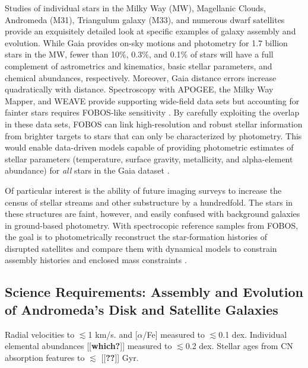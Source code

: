 \documentclass[11pt,a4paper,twoside,onecolumn,openany,final,oldfontcommands]{memoir}
\newcommand{\edit}[2][todo]{{\color{#1}[[{\bf #2}]]}}
\begin{document}
Studies of individual stars in the Milky Way (MW), Magellanic Clouds, Andromeda (M31), Triangulum galaxy (M33), and numerous dwarf satellites provide an exquisitely detailed look at specific examples of galaxy assembly and evolution. While Gaia provides on-sky motions and photometry for 1.7 billion stars in the MW, fewer than 10\%, 0.3\%, and 0.1\% of stars will have a full complement of astrometrics and kinematics, basic stellar parameters, and chemical abundances, respectively.  Moreover, Gaia distance errors increase quadratically with distance.  Spectroscopy with APOGEE, the Milky Way Mapper, and WEAVE provide supporting wide-field data sets but accounting for fainter stars requires FOBOS-like sensitivity \citep[see][]{dey19,sanderson19}.  By carefully exploiting the overlap in these data sets, FOBOS can link high-resolution and robust stellar information from brighter targets to stars that can only be characterized by photometry.  This would enable data-driven models capable of providing photometric estimates of stellar parameters (temperature, surface gravity, metallicity, and alpha-element abundance) for {\it all} stars in the Gaia dataset  \citep[see][]{2015ApJ...808...16N, 2018arXiv180401530T, 2018arXiv180803278T}. 

Of particular interest is the ability of future imaging surveys to increase the census of stellar streams and other substructure by a hundredfold.  The stars in these structures are faint, however, and easily confused with background galaxies in ground-based photometry.  With spectrocopic reference samples from FOBOS, the goal is to photometrically reconstruct the star-formation histories of disrupted satellites and compare them with dynamical models to constrain assembly histories and enclosed mass constraints \citep[e.g.,][]{2017ApJ...836..234S}.

\subsection{Science Requirements: Assembly and Evolution of Andromeda's Disk and Satellite Galaxies}

\begin{sciencerequirement}

\reqitem Radial velocities to $\lesssim$1 km/s.
\reqitem[] [Fe/H] and [$\alpha$/Fe] measured to $\lesssim$0.1 dex.
\reqitem Individual elemental abundances \edit{which?} measured to $\lesssim$0.2 dex.
\reqitem Stellar ages from CN absorption features to $\lesssim$ \edit{??} Gyr.

\end{sciencerequirement}
\end{document}
